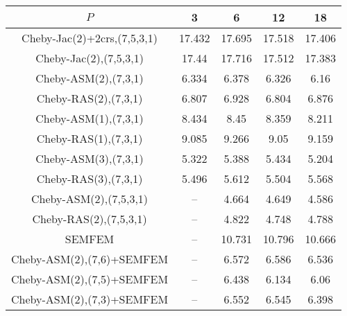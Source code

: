 \begin{table*}
\centering
\begin{tabular}{||c||cccc||}
	\hline
	$P$ & 3 & 6 & 12 & 18 \\
	\hline\hline
	Cheby-Jac(2)+2crs,(7,5,3,1)	&	17.432	&	17.695	&	17.518	&	17.406\\
	Cheby-Jac(2),(7,5,3,1)	&	17.44	&	17.716	&	17.512	&	17.383\\
	Cheby-ASM(2),(7,3,1)	&	6.334	&	6.378	&	6.326	&	6.16\\
	Cheby-RAS(2),(7,3,1)	&	6.807	&	6.928	&	6.804	&	6.876\\
	Cheby-ASM(1),(7,3,1)	&	8.434	&	8.45	&	8.359	&	8.211\\
	Cheby-RAS(1),(7,3,1)	&	9.085	&	9.266	&	9.05	&	9.159\\
	Cheby-ASM(3),(7,3,1)	&	5.322	&	5.388	&	5.434	&	5.204\\
	Cheby-RAS(3),(7,3,1)	&	5.496	&	5.612	&	5.504	&	5.568\\
	Cheby-ASM(2),(7,5,3,1)	&	 --	&	4.664	&	4.649	&	4.586\\
	Cheby-RAS(2),(7,5,3,1)	&	 --	&	4.822	&	4.748	&	4.788\\
	SEMFEM	&	 --	&	10.731	&	10.796	&	10.666\\
	Cheby-ASM(2),(7,6)+SEMFEM	&	 --	&	6.572	&	6.586	&	6.536\\
	Cheby-ASM(2),(7,5)+SEMFEM	&	 --	&	6.438	&	6.134	&	6.06\\
	Cheby-ASM(2),(7,3)+SEMFEM	&	 --	&	6.552	&	6.545	&	6.398\\
\hline
\end{tabular}
\caption{\label{table:foobar}}
\end{table*}
